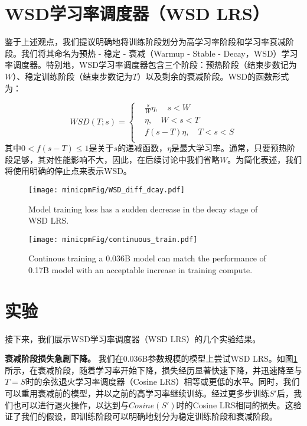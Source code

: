 \section{WSD学习率调度器（WSD LRS）}
鉴于上述观点，我们提议明确地将训练阶段划分为高学习率阶段和学习率衰减阶段。我们将其命名为预热 - 稳定 - 衰减（Warmup - Stable - Decay，WSD）学习率调度器。特别地，WSD学习率调度器包含三个阶段：预热阶段（结束步数记为$W$）、稳定训练阶段（结束步数记为$T$）以及剩余的衰减阶段。WSD的函数形式为：

\vspace{-2mm}
\begin{equation}
    WSD(T; s) = \begin{cases}
       & \frac{s}{W} \eta, \quad s<W\\
       & \eta, \quad W < s < T \\
       & f(s-T)\eta,\quad T < s < S\\
    \end{cases}
\end{equation}
其中$0 < f(s - T) \leq 1$是关于$s$的递减函数，$\eta$是最大学习率。通常，只要预热阶段足够，其对性能影响不大，因此，在后续讨论中我们省略$W$。为简化表述，我们将使用明确的停止点来表示WSD。 



\begin{figure}[htbp]
    \centering
    \texttt{[image: minicpmFig/WSD\_diff\_dcay.pdf]}
    \caption{ Model training loss has a sudden decrease in the decay stage of WSD LRS. }
    \label{fig:wsd_diff_dcay}
\end{figure}

\begin{figure}[htbp]
    \texttt{[image: minicpmFig/continuous\_train.pdf]}
    \caption{Continous training a 0.036B model can match the performance of 0.17B model with an acceptable increase in training compute.}
    \label{fig:continuoustrain}
\end{figure}


\section{实验}
\label{sec:wsd_experiments_continoustrain}
接下来，我们展示WSD学习率调度器（WSD LRS）的几个实验结果。

\textbf{衰减阶段损失急剧下降。} 我们在0.036B参数规模的模型上尝试WSD LRS。如图\ref{fig:wsd_diff_dcay}所示，在衰减阶段，随着学习率开始下降，损失经历显著快速下降，并迅速降至与$T = S$时的余弦退火学习率调度器（Cosine LRS）相等或更低的水平。同时，我们可以重用衰减前的模型，并以之前的高学习率继续训练。经过更多步训练$S'$后，我们也可以进行退火操作，以达到与$Cosine(S')$时的Cosine LRS相同的损失。这验证了我们的假设，即训练阶段可以明确地划分为稳定训练阶段和衰减阶段。

